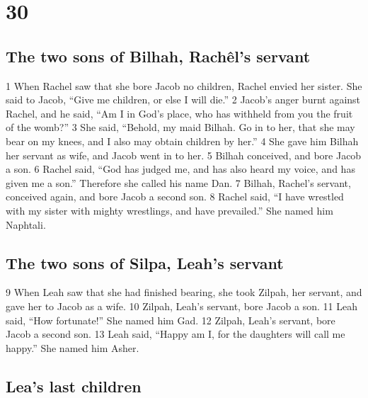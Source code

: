\hypertarget{section-29}{%
\section{30}\label{section-29}}

\hypertarget{the-two-sons-of-bilhah-rachuxeals-servant}{%
\subsection{The two sons of Bilhah, Rachêl's
servant}\label{the-two-sons-of-bilhah-rachuxeals-servant}}

{1} When Rachel saw that she bore Jacob no children, Rachel envied her
sister. She said to Jacob, ``Give me children, or else I will die.'' {2}
Jacob's anger burnt against Rachel, and he said, ``Am I in God's place,
who has withheld from you the fruit of the womb?'' {3} She said,
``Behold, my maid Bilhah. Go in to her, that she may bear on my knees,
and I also may obtain children by her.'' {4} She gave him Bilhah her
servant as wife, and Jacob went in to her. {5} Bilhah conceived, and
bore Jacob a son. {6} Rachel said, ``God has judged me, and has also
heard my voice, and has given me a son.'' Therefore she called his name
Dan. {7} Bilhah, Rachel's servant, conceived again, and bore Jacob a
second son. {8} Rachel said, ``I have wrestled with my sister with
mighty wrestlings, and have prevailed.'' She named him Naphtali.

\hypertarget{the-two-sons-of-silpa-leahs-servant}{%
\subsection{The two sons of Silpa, Leah's
servant}\label{the-two-sons-of-silpa-leahs-servant}}

{9} When Leah saw that she had finished bearing, she took Zilpah, her
servant, and gave her to Jacob as a wife. {10} Zilpah, Leah's servant,
bore Jacob a son. {11} Leah said, ``How fortunate!'' She named him Gad.
{12} Zilpah, Leah's servant, bore Jacob a second son. {13} Leah said,
``Happy am I, for the daughters will call me happy.'' She named him
Asher.

\hypertarget{leas-last-children}{%
\subsection{Lea's last children}\label{leas-last-children}}

